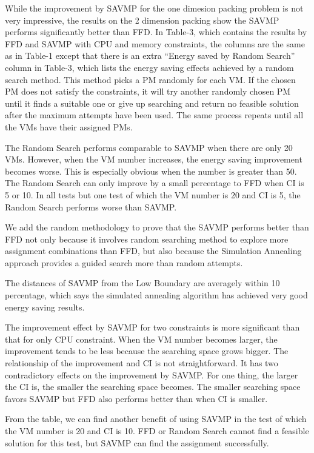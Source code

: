 \documentclass[10pt, conference, compsocconf]{IEEEtran}
\begin{document}
While the improvement by SAVMP for the one dimesion packing problem is not very
impressive, the results on the 2 dimension packing show the SAVMP performs
significantly better than FFD. In Table-3, which contains the results by FFD and
SAVMP with CPU and memory constraints, the columns are the same as in Table-1
except that there is an extra ``Energy saved by Random Search'' column in
Table-3, which lists the energy saving effects achieved by a random search
method. This method picks a PM randomly for each VM. If the chosen PM does not
satisfy the constraints, it will try another randomly chosen PM until it finds a
suitable one or give up searching and return no feasible solution after the
maximum attempts have been used. The same process repeats until all the VMs have
their assigned PMs.

The Random Search performs comparable to SAVMP when there are only 20 VMs.
However, when the VM number increases, the energy saving improvement becomes
worse. This is especially obvious when the number is greater than 50. The Random
Search can only improve by a small percentage to FFD when CI is 5 or 10. In all
tests but one test of which the VM number is 20 and CI is 5, the Random Search
performs worse than SAVMP.

We add the random methodology to prove that the SAVMP performs better than FFD
not only because it involves random searching method to explore more assignment
combinations than FFD, but also because the Simulation Annealing approach
provides a guided search more than random attempts.

The distances of SAVMP from the Low Boundary are averagely within 10 percentage,
which says the simulated annealing algorithm has achieved very good energy
saving results.

The improvement effect by SAVMP for two constraints is more significant than
that for only CPU constraint. When the VM number becomes larger, the improvement
tends to be less because the searching space grows bigger. The relationship of
the improvement and CI is not straightforward. It has two contradictory effects
on the improvement by SAVMP. For one thing, the larger the CI is, the smaller
the searching space becomes. The smaller searching space favors SAVMP but FFD
also performs better than when CI is smaller.

From the table, we can find another benefit of using SAVMP in the test of which
the VM number is 20 and CI is 10. FFD or Random Search cannot find a feasible
solution for this test, but SAVMP can find the assignment successfully.
\end{document}
